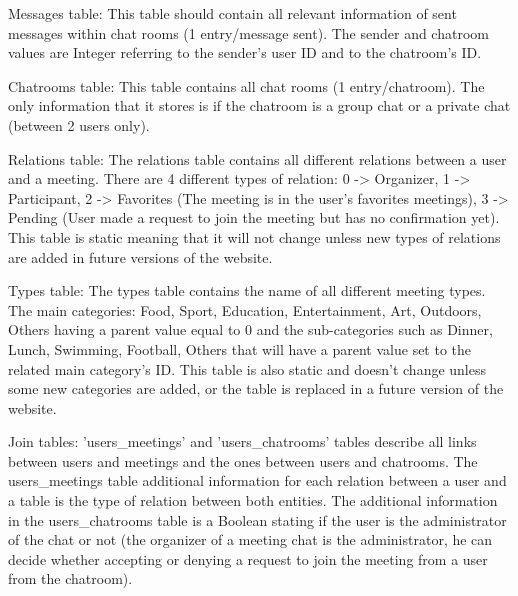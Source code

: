 \documentclass[conference]{IEEEtran}
\begin{document}
Messages table:
This table should contain all relevant information of sent messages within chat rooms (1 entry/message sent). The sender and chatroom values are Integer referring to the sender’s user ID and to the chatroom’s ID.

Chatrooms table:
This table contains all chat rooms (1 entry/chatroom). The only information that it stores is if the chatroom is a group chat or a private chat (between 2 users only).

Relations table:
The relations table contains all different relations between a user and a meeting. There are 4 different types of relation: 0 -> Organizer, 1 -> Participant, 2 -> Favorites (The meeting is in the user’s favorites meetings), 3 -> Pending (User made a request to join the meeting but has no confirmation yet). This table is static meaning that it will not change unless new types of relations are added in future versions of the website.

Types table:
The types table contains the name of all different meeting types. The main categories: Food, Sport, Education, Entertainment, Art, Outdoors, Others having a parent value equal to 0 and the sub-categories such as Dinner, Lunch, Swimming, Football, Others that will have a parent value set to the related main category’s ID. This table is also static and doesn’t change unless some new categories are added, or the table is replaced in a future version of the website.

Join tables:
'users\_meetings' and 'users\_chatrooms' tables describe all links between users and meetings and the ones between users and chatrooms. The users\_meetings table additional information for each relation between a user and a table is the type of relation between both entities. The additional information in the users\_chatrooms table is a Boolean stating if the user is the administrator of the chat or not (the organizer of a meeting chat is the administrator, he can decide whether accepting or denying a request to join the meeting from a user from the chatroom).
\end{document}
